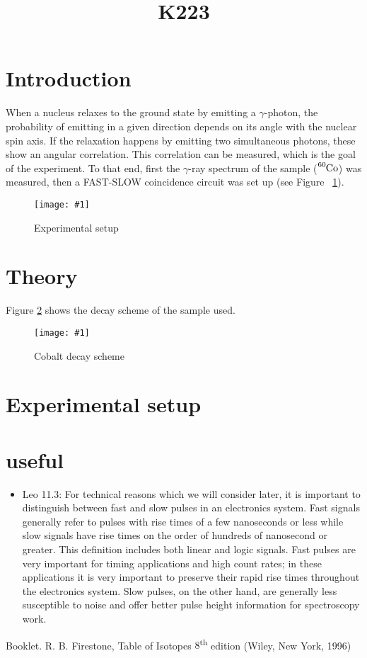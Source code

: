 \documentclass[twocolumn]{article}
\title{K223}
\newcommand{\insertFigure}[1]{%
   \texttt{[image: \#1]}%
}
\begin{document}
\maketitle
\newpage
\section{Introduction}
When a nucleus relaxes to the ground state by emitting a $\gamma$-photon, the probability of emitting in a given direction depends on its angle with the nuclear spin axis. If the relaxation happens by emitting two simultaneous photons, these show an angular correlation. This correlation can be measured, which is the goal of the experiment. To that end, first the $\gamma$-ray spectrum of the sample ($\ce{^{60}Co}$) was measured, then a FAST-SLOW coincidence circuit was set up (see Figure ~\ref{fig:exp_setup}). %
\begin{figure}[!h]
\centering
\insertFigure{k223_setup.png}
\caption{Experimental setup \cite{booklet}}
\label{fig:exp_setup}
\end{figure}
\section{Theory}
Figure \ref{fig:cobalt_scheme} shows the decay scheme of the sample used.
\begin{figure}[!h]
\centering
\insertFigure{cobalt_scheme.png}
\caption{Cobalt decay scheme \cite{cobalt_scheme}}
\label{fig:cobalt_scheme}
\end{figure}
\section{Experimental setup}

\section{useful}
\begin{itemize}
\item Leo 11.3: For technical reasons which we will consider later, it is important to distinguish between fast and slow pulses in an electronics system. Fast signals generally refer to pulses with rise times of a few nanoseconds or less while slow signals have rise times on the order of hundreds of nanosecond or greater. This definition includes both linear and logic signals. Fast pulses are very important for timing applications and high count rates; in these applications it is very important to preserve their rapid rise times throughout the electronics system. Slow pulses, on the other hand, are generally less susceptible to noise and offer better pulse height information for spectroscopy work.
\end{itemize}
\begin{thebibliography}{9}
Booklet.
R. B. Firestone, Table of Isotopes $8$\textsuperscript{th} edition
 (Wiley, New York, 1996)
\end{thebibliography}
\end{document}
